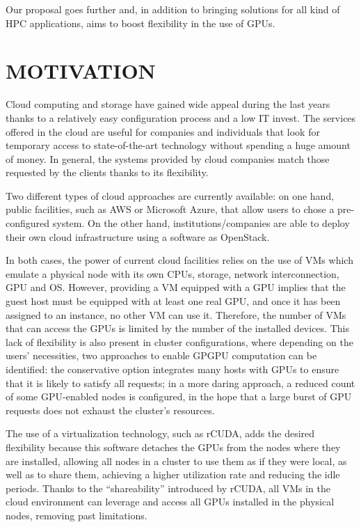 \documentclass[a4paper,twoside]{article}
\begin{document}
Our proposal goes further and, in addition to 
bringing solutions for all kind of HPC applications, aims 
to boost flexibility in the use of GPUs.

\section{\uppercase{Motivation}}
\label{sec:motivation}

Cloud computing and storage have gained wide appeal  
during the last years thanks to a relatively easy configuration  
process and a low IT invest. The services offered in the cloud are useful for companies and individuals 
that look for temporary access to state-of-the-art technology without spending a 
huge amount of money. In general, the systems provided by cloud 
companies match those requested by the clients thanks to its flexibility.

Two different types of cloud approaches are currently available:
on one hand, public facilities, such as AWS or 
Microsoft Azure, that allow users to chose a pre-configured system.   
On the other hand, institutions/companies 
are able to deploy their own cloud infrastructure using a software as OpenStack.  

In both cases, the power of current cloud facilities relies on the use 
of VMs which  
emulate a physical node with its own 
CPUs, storage, network interconnection, GPU and OS. 
However, providing a VM equipped with a GPU implies
that the guest host must be equipped with at least one real GPU, and
once it has been assigned to an instance, no other VM can use
it. Therefore, the number of VMs that can access the GPUs is 
limited by the number of the installed devices. This lack of 
flexibility is also present in cluster configurations, where 
depending on the users' necessities, 
two approaches to enable GPGPU computation can be identified:
the conservative option integrates many hosts with GPUs to 
ensure that it is likely to satisfy all requests; in a
more daring approach, a reduced count of some GPU-enabled nodes is configured, in the hope that a large burst of GPU requests 
 does not exhaust the cluster's resources.

The use of a virtualization technology, such as {rCUDA}, adds 
the desired flexibility because this software detaches the GPUs 
from the nodes where they are installed, allowing all nodes in a cluster
to use them as if they were local, as well as to share them, 
achieving a higher utilization rate and reducing the idle periods.
Thanks to the ``shareability'' introduced by {rCUDA}, all VMs in the cloud 
environment can leverage and access all GPUs installed in 
the physical nodes, removing past limitations. 
\end{document}
